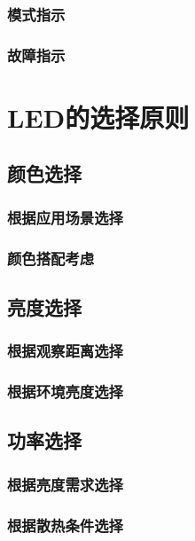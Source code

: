 \documentclass[12pt,UTF8]{ctexbook}
\begin{document}
\subsection{模式指示}

\subsection{故障指示}

\chapter{LED的选择原则}

\section{颜色选择}

\subsection{根据应用场景选择}

\subsection{颜色搭配考虑}

\section{亮度选择}

\subsection{根据观察距离选择}

\subsection{根据环境亮度选择}

\section{功率选择}

\subsection{根据亮度需求选择}

\subsection{根据散热条件选择}
\end{document}
